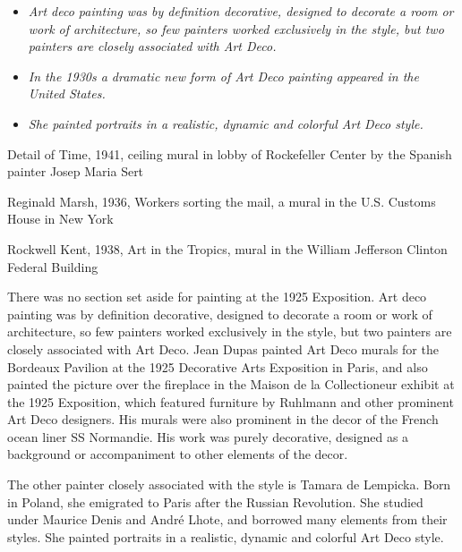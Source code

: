 \begin{itemize}
\item
  \emph{Art deco painting was by definition decorative, designed to
  decorate a room or work of architecture, so few painters worked
  exclusively in the style, but two painters are closely associated with
  Art Deco.}
\item
  \emph{In the 1930s a dramatic new form of Art Deco painting appeared
  in the United States.}
\item
  \emph{She painted portraits in a realistic, dynamic and colorful Art
  Deco style.}
\end{itemize}

Detail of Time, 1941, ceiling mural in lobby of Rockefeller Center by
the Spanish painter Josep Maria Sert

Reginald Marsh, 1936, Workers sorting the mail, a mural in the U.S.
Customs House in New York

Rockwell Kent, 1938, Art in the Tropics, mural in the William Jefferson
Clinton Federal Building

There was no section set aside for painting at the 1925 Exposition. Art
deco painting was by definition decorative, designed to decorate a room
or work of architecture, so few painters worked exclusively in the
style, but two painters are closely associated with Art Deco. Jean Dupas
painted Art Deco murals for the Bordeaux Pavilion at the 1925 Decorative
Arts Exposition in Paris, and also painted the picture over the
fireplace in the Maison de la Collectioneur exhibit at the 1925
Exposition, which featured furniture by Ruhlmann and other prominent Art
Deco designers. His murals were also prominent in the decor of the
French ocean liner SS Normandie. His work was purely decorative,
designed as a background or accompaniment to other elements of the
decor.

The other painter closely associated with the style is Tamara de
Lempicka. Born in Poland, she emigrated to Paris after the Russian
Revolution. She studied under Maurice Denis and André Lhote, and
borrowed many elements from their styles. She painted portraits in a
realistic, dynamic and colorful Art Deco style.

